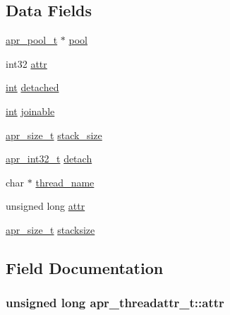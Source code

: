 \subsection*{Data Fields}
\begin{DoxyCompactItemize}
\item 
\hyperlink{structapr__pool__t}{apr\+\_\+pool\+\_\+t} $\ast$ \hyperlink{structapr__threadattr__t_ab56f0d904d2ddbba08df3e9a3aa5f049}{pool}
\item 
int32 \hyperlink{structapr__threadattr__t_a481d3a9ce8976b40beae53f63cc98012}{attr}
\item 
\hyperlink{pcre_8txt_a42dfa4ff673c82d8efe7144098fbc198}{int} \hyperlink{structapr__threadattr__t_ac96af472adab60a574168a81b605919f}{detached}
\item 
\hyperlink{pcre_8txt_a42dfa4ff673c82d8efe7144098fbc198}{int} \hyperlink{structapr__threadattr__t_a91b992248a924b5930a805d183dcbd46}{joinable}
\item 
\hyperlink{group__apr__platform_gaaa72b2253f6f3032cefea5712a27540e}{apr\+\_\+size\+\_\+t} \hyperlink{structapr__threadattr__t_ab0c95add41d5f494fb28b373fb549f33}{stack\+\_\+size}
\item 
\hyperlink{group__apr__platform_ga21ef1e35fd3ff9be386f3cb20164ff02}{apr\+\_\+int32\+\_\+t} \hyperlink{structapr__threadattr__t_acf5cc381c329e14e198193a694d11c8a}{detach}
\item 
char $\ast$ \hyperlink{structapr__threadattr__t_af04e3acad7d29855ff0fc82e6aa048e0}{thread\+\_\+name}
\item 
unsigned long \hyperlink{structapr__threadattr__t_afc5aedb6c80f23a7e82e2ff7d1c313cc}{attr}
\item 
\hyperlink{group__apr__platform_gaaa72b2253f6f3032cefea5712a27540e}{apr\+\_\+size\+\_\+t} \hyperlink{structapr__threadattr__t_afa9476d4c71309de2f452e11b7d07aeb}{stacksize}
\end{DoxyCompactItemize}


\subsection{Field Documentation}
\subsubsection[{\texorpdfstring{attr}{attr}}]{\setlength{\rightskip}{0pt plus 5cm}unsigned long apr\+\_\+threadattr\+\_\+t\+::attr}\hypertarget{structapr__threadattr__t_afc5aedb6c80f23a7e82e2ff7d1c313cc}{}\label{structapr__threadattr__t_afc5aedb6c80f23a7e82e2ff7d1c313cc}
